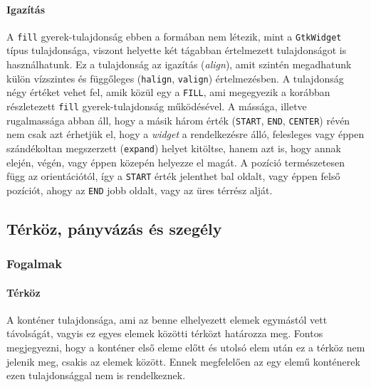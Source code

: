 \paragraph{Igazítás}

A \texttt{fill} gyerek-tulajdonság ebben a formában nem létezik, mint a \texttt{GtkWidget} típus tulajdonsága, viszont helyette két tágabban értelmezett tulajdonságot is használhatunk. Ez a tulajdonság az igazítás (\textit{align}), amit szintén megadhatunk külön vízszintes és függőleges (\texttt{halign}, \texttt{valign}) értelmezésben. A tulajdonság négy értéket vehet fel, amik közül egy a \texttt{FILL}, ami megegyezik a korábban részletezett \texttt{fill} gyerek-tulajdonság működésével. A mássága, illetve rugalmassága abban áll, hogy a másik három érték (\texttt{START}, \texttt{END}, \texttt{CENTER}) révén nem csak azt érhetjük el, hogy a \textit{widget} a rendelkezésre álló, felesleges vagy éppen szándékoltan megszerzett (\texttt{expand}) helyet kitöltse, hanem azt is, hogy annak elején, végén, vagy éppen közepén helyezze el magát. A pozíció természetesen függ az orientációtól, így a \texttt{START} érték jelenthet bal oldalt, vagy éppen felső pozíciót, ahogy az \texttt{END} jobb oldalt, vagy az üres térrész alját.

\subsection{Térköz, pányvázás és szegély}

\subsubsection{Fogalmak}

\paragraph{Térköz}

A konténer tulajdonsága, ami az benne elhelyezett elemek egymástól vett távolságát, vagyis ez egyes elemek közötti térközt határozza meg. Fontos megjegyezni, hogy a konténer első eleme előtt és utolsó elem után ez a térköz nem jelenik meg, csakis az elemek között. Ennek megfelelően az egy elemű konténerek ezen tulajdonsággal nem is rendelkeznek.

